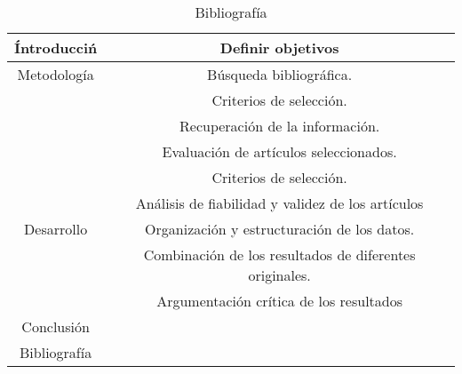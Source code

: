 \begin{table}[h] 
	\footnotesize%
	\begin{center}
		\footnotesize
		\begin{tabular}{|c|c|}
		\hline
			\'Introducci\'n   & Definir objetivos     \\
		\hline  			
		    Metodología	&  Búsqueda bibliográfica. \\
		    	& Criterios de selección. \\
		    	&  Recuperación de la información. \\
		  		& Evaluación de  artículos seleccionados. \\
		  		& Criterios de selección. \\
		  		& Análisis  de fiabilidad y validez de los artículos \\  
		 \hline
			Desarrollo &  Organización y estructuración de los datos. \\
			 
		    & Combinación de los resultados de diferentes originales. \\
			& Argumentación crítica de los resultados   \\
		\hline
		   Conclusión	&  \\
		\hline
			Bibliografía	&  \\
			
		\hline  			
			
		\end{tabular}
	\end{center}
	\caption{Bibliograf\'ia }
	\label{tab:biblio}
\end{table} 

 